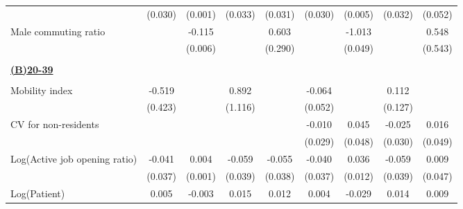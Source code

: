 \begin{tabular}{l*{8}{c}}
                    &     (0.030)         &     (0.001)         &     (0.033)         &     (0.031)         &     (0.030)         &     (0.005)         &     (0.032)         &     (0.052)         \\
\addlinespace
Male commuting ratio&                     &      -0.115\sym{***}&                     &       0.603\sym{**} &                     &      -1.013\sym{***}&                     &       0.548         \\
                    &                     &     (0.006)         &                     &     (0.290)         &                     &     (0.049)         &                     &     (0.543)         \\
\hline \\ \multicolumn{9}{l}{\textbf{\underline{(B)20-39}}} \\\\[-1ex]
Mobility index      &      -0.519         &                     &       0.892         &                     &      -0.064         &                     &       0.112         &                     \\
                    &     (0.423)         &                     &     (1.116)         &                     &     (0.052)         &                     &     (0.127)         &                     \\
\addlinespace
CV for non-residents&                     &                     &                     &                     &      -0.010         &       0.045         &      -0.025         &       0.016         \\
                    &                     &                     &                     &                     &     (0.029)         &     (0.048)         &     (0.030)         &     (0.049)         \\
\addlinespace
Log(Active job opening ratio)&      -0.041         &       0.004\sym{***}&      -0.059         &      -0.055         &      -0.040         &       0.036\sym{***}&      -0.059         &       0.009         \\
                    &     (0.037)         &     (0.001)         &     (0.039)         &     (0.038)         &     (0.037)         &     (0.012)         &     (0.039)         &     (0.047)         \\
\addlinespace
Log(Patient)        &       0.005         &      -0.003\sym{***}&       0.015         &       0.012         &       0.004         &      -0.029\sym{***}&       0.014         &       0.009         \\

\end{tabular}
